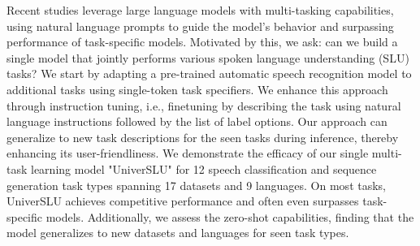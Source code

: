 Recent studies leverage large language models with multi-tasking capabilities, using natural language prompts to guide the model's behavior and surpassing performance of task-specific models. Motivated by this, we ask: can we build a single model that jointly performs various spoken language understanding (SLU) tasks? We start by adapting a pre-trained automatic speech recognition model to additional tasks using single-token task specifiers. We enhance this approach through instruction tuning, i.e., finetuning by describing the task using natural language instructions followed by the list of label options. Our approach can generalize to new task descriptions for the seen tasks during inference, thereby enhancing its user-friendliness. We demonstrate the efficacy of our single multi-task learning model "UniverSLU" for 12 speech classification and sequence generation task types spanning 17 datasets and 9 languages. On most tasks, UniverSLU achieves competitive performance and often even surpasses task-specific models. Additionally, we assess the zero-shot capabilities, finding that the model generalizes to new datasets and languages for seen task types.
